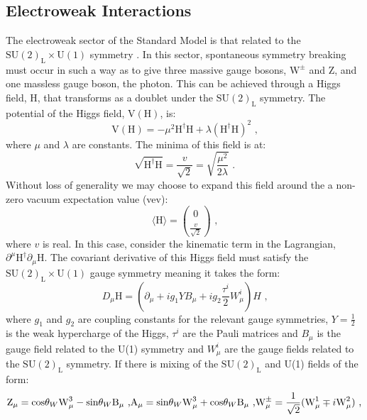 \subsection{Electroweak Interactions}
\label{sec:ewint}
The electroweak sector of the Standard Model is that related to the $\text{SU}(2)_{\text{L}} \times \text{U}(1)$ symmetry \cite{Ellis:2013jnq}.  In this sector, spontaneous symmetry breaking must occur in such a way as to give three massive gauge bosons,  $\text{W}^{\pm}$ and Z, and one massless gauge boson, the photon.  This can be achieved through a Higgs field, H, that transforms as a doublet under the $\text{SU}(2)_{\text{L}}$ symmetry.  The potential of the Higgs field, $\text{V}(\text{H})$, is:
%
\begin{equation}
\text{V}(\text{H}) = -\mu^{2}\text{H}^{\dagger}\text{H} + \lambda (\text{H}^{\dagger}\text{H})^{2} \text{ ,}
\end{equation}
%
\noindent where $\mu$ and $\lambda$ are constants.  The minima of this field is at:
%
\begin{equation}
\sqrt{\text{H}^{\dagger}\text{H}} = \frac{v}{\sqrt{2}} = \sqrt{\frac{\mu^{2}}{2\lambda}} \text{ .}
\end{equation}
%
\noindent Without loss of generality we may choose to expand this field around the a non-zero vacuum expectation value (vev):
%
\begin{equation}
\langle \text{H} \rangle = \binom{0}{\frac{v}{\sqrt{2}}} \text{ ,}
\end{equation}
%
\noindent where $v$ is real.  In this case, consider the kinematic term in the Lagrangian, $\partial^{\mu} \text{H}^{\dagger} \partial_{\mu} \text{H}$.  The covariant derivative of this Higgs field must satisfy the $\text{SU}(2)_{\text{L}} \times \text{U}(1)$ gauge symmetry meaning it takes the form:
%
\begin{equation}
D_{\mu} \text{H} = (\partial_{\mu} + ig_{1}YB_{\mu} + ig_{2}\frac{\tau^{i}}{2}W^{i}_{\mu})H \text{ ,}
\end{equation}
%
\noindent where $g_{1}$ and $g_{2}$ are coupling constants for the relevant gauge symmetries, $Y = \frac{1}{2}$ is the weak hypercharge of the Higgs, $\tau^{i}$ are the Pauli matrices and $B_{\mu}$ is the gauge field related to the U(1) symmetry and $W^{i}_{\mu}$ are the gauge fields related to the $\text{SU}(2)_{\text{L}}$ symmetry.  If there is mixing of the $\text{SU}(2)_{\text{L}}$ and U(1) fields of the form:
%
\begin{equation}
\text{Z}_{\mu} = \text{cos}{\theta_{W}} \text{W}^{3}_{\mu} - \text{sin}{\theta_{W}} \text{B}_{\mu} \text{ ,}\\
\text{A}_{\mu} = \text{sin}{\theta_{W}} \text{W}^{3}_{\mu} + \text{cos}{\theta_{W}} \text{B}_{\mu} \text{ ,}\\
\text{W}^{\pm}_{\mu} = \frac{1}{\sqrt{2}}(\text{W}^{1}_{\mu} \mp i \text{W}^{2}_{\mu}) \text{ ,}
\end{equation}
